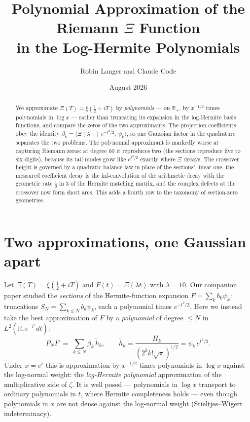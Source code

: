\documentclass[11pt]{article}
\title{Polynomial Approximation of the Riemann $\Xi$ Function\\
in the Log-Hermite Polynomials}
\author{Robin Langer and Claude Code}
\date{August 2026}
\theoremstyle{remark}
\newcommand{\R}{\mathbb{R}}
\begin{document}
\maketitle

\begin{abstract}
We approximate $\Xi(T) = \xi(\tfrac12 + iT)$ by \emph{polynomials} --- on $\R_+$, by $x^{-1/2}$ times polynomials in $\log x$ --- rather than truncating its expansion in the log-Hermite basis functions, and compare the zeros of the two approximants. The projection coefficients obey the identity $\beta_k = \langle \Xi(\lambda\,\cdot)\, e^{-t^2/2},\, \psi_k\rangle$, so one Gaussian factor in the quadrature separates the two problems. The polynomial approximant is markedly worse at capturing Riemann zeros: at degree $60$ it reproduces two (the sections reproduce five to six digits), because its tail modes grow like $e^{t^2/2}$ exactly where $\Xi$ decays. The crossover height is governed by a quadratic balance law in place of the sections' linear one, the measured coefficient decay is the inf-convolution of the arithmetic decay with the geometric rate $\tfrac12\ln 3$ of the Hermite matching matrix, and the complex defects at the crossover now form short arcs. This adds a fourth row to the taxonomy of section-zero geometries.
\end{abstract}

\section{Two approximations, one Gaussian apart}

Let $\Xi(T) = \xi(\tfrac12 + iT)$ and $F(t) = \Xi(\lambda t)$ with $\lambda = 10$. Our companion paper studied the \emph{sections} of the Hermite-function expansion $F = \sum_k b_k \psi_k$: truncations $S_N = \sum_{k \le N} b_k \psi_k$, each a polynomial times $e^{-t^2/2}$. Here we instead take the best approximation of $F$ by a \emph{polynomial} of degree $\le N$ in $L^2(\R, e^{-t^2}dt)$:
\[
P_N F \;=\; \sum_{k \le N} \beta_k\, \tilde h_k, \qquad
\tilde h_k = \frac{H_k}{(2^k k! \sqrt{\pi})^{1/2}} = \psi_k\, e^{t^2/2}.
\]
Under $x = e^t$ this is approximation by $x^{-1/2}$ times polynomials in $\log x$ against the log-normal weight: the \emph{log-Hermite polynomial} approximation of the multiplicative side of $\zeta$. It is well posed --- polynomials in $\log x$ transport to ordinary polynomials in $t$, where Hermite completeness holds --- even though polynomials in $x$ are not dense against the log-normal weight (Stieltjes--Wigert indeterminacy).
\end{document}
